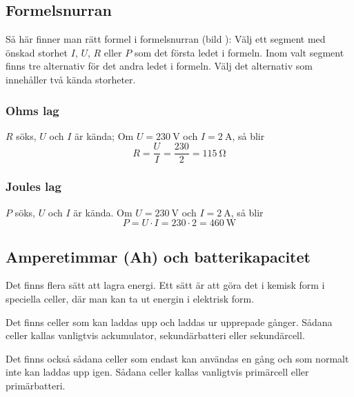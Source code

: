 \pagebreak[3]

\subsection{Formelsnurran}


Så här finner man rätt formel i formelsnurran (bild ):
Välj ett segment med önskad storhet \(I\), \(U\), \(R\) eller \(P\) som det
första ledet i formeln.
Inom valt segment finns tre alternativ för det andra ledet i formeln.
Välj det alternativ som innehåller två kända storheter.


\subsubsection{Ohms lag}

\(R\) söks, \(U\) och \(I\) är kända;
Om \(U = \qty{230}{\volt}\) och \(I = \qty{2}{\ampere}\), så blir
\[R=\dfrac{U}{I}=\dfrac{230}{2}=\qty{115}{\ohm}\]
\subsubsection{Joules lag}

\(P\) söks, \(U\) och \(I\) är kända.
Om \(U = \qty{230}{\volt}\) och \(I = \qty{2}{\ampere}\), så blir
\[P = U \cdot I = 230 \cdot 2 = \qty{460}{\watt}\]
\subsection{Amperetimmar (Ah) och batterikapacitet}
\label{batterikapacitet}

Det finns flera sätt att lagra energi.
Ett sätt är att göra det i kemisk form i speciella celler, där man kan ta ut
energin i elektrisk form.

Det finns celler som kan laddas upp och laddas ur upprepade gånger.
Sådana celler kallas vanligtvis ackumulator, sekundärbatteri eller
sekundärcell.

\newpage
Det finns också sådana celler som endast kan användas en gång och som normalt
inte kan laddas upp igen.
Sådana celler kallas vanligtvis primärcell eller primärbatteri.

